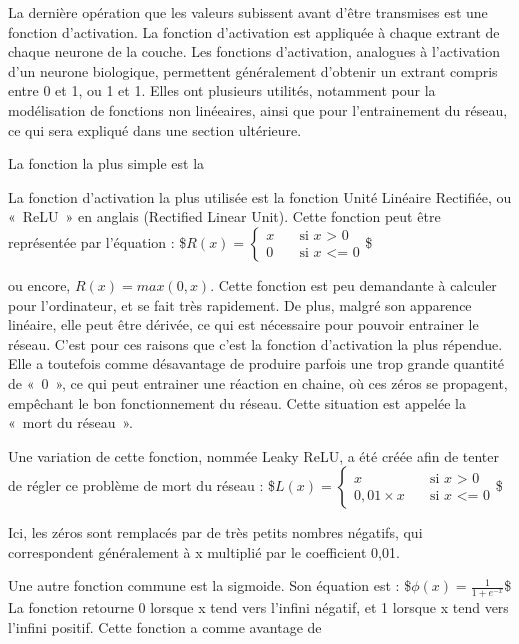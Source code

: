 \documentclass[letterpaper,10pt,french]{sphinxmanual}
\begin{document}
La dernière opération que les valeurs subissent avant d’être transmises est une fonction d’activation. La fonction d’activation est appliquée à chaque extrant de chaque
neurone de la couche. Les fonctions d’activation, analogues à l’activation
d’un neurone biologique, permettent généralement d’obtenir un extrant compris entre 0 et 1, ou \sphinxhyphen{}1 et 1. Elles ont plusieurs utilités, notamment
pour la modélisation de fonctions non linéeaires, ainsi que pour l’entrainement du réseau, ce qui sera expliqué dans une section ultérieure.

La fonction la plus simple est la

La fonction d’activation la plus utilisée est la fonction Unité Linéaire Rectifiée, ou « ReLU » en anglais (Rectified Linear Unit).
Cette fonction peut être représentée par l’équation :  \$\(
R(x)=
\begin{cases}
 x & \quad \text{si } x \text{ > 0}\\
 0 & \quad \text{si } x \text{ <= 0}
\end{cases}
\)\$

ou encore, \( R(x) = max(0, x)\). Cette fonction est peu demandante à calculer pour l’ordinateur, et se fait très rapidement. De plus, malgré son apparence linéaire,
elle peut être dérivée, ce qui est nécessaire pour pouvoir entrainer le réseau. C’est pour ces raisons que c’est la fonction d’activation la plus répendue.
Elle a toutefois comme désavantage de produire parfois une trop grande quantité de « 0 », ce qui peut entrainer une réaction en chaine, où ces zéros se propagent,
empêchant le bon fonctionnement du réseau. Cette situation est appelée la « mort du réseau ».

Une variation de cette fonction, nommée Leaky ReLU, a été créée afin de tenter de régler ce problème de mort du réseau : \$\( 
L(x)=
\begin{cases}
 x & \quad \text{si } x \text{ > 0}\\
 0,01 \times x & \quad \text{si } x \text{ <= 0}
\end{cases}
\)\$

Ici, les zéros sont remplacés par de très petits nombres négatifs, qui correspondent généralement à x multiplié par le coefficient 0,01.

Une autre fonction commune est la sigmoide. Son équation est : \$\( \phi(x) = 
                                                                    \frac{1}{1 + e^{-x}}
                                                                    \)\$
La fonction retourne 0 lorsque x tend vers l’infini négatif, et 1 lorsque x tend vers l’infini positif. Cette fonction a comme avantage de
\end{document}
